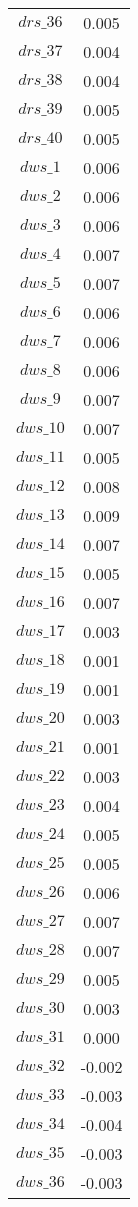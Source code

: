 \begin{center}
\begin{longtable}{cc}
$drs\_36$ 	 & 	 0.005 \\
$drs\_37$ 	 & 	 0.004 \\
$drs\_38$ 	 & 	 0.004 \\
$drs\_39$ 	 & 	 0.005 \\
$drs\_40$ 	 & 	 0.005 \\
$dws\_1$ 	 & 	 0.006 \\
$dws\_2$ 	 & 	 0.006 \\
$dws\_3$ 	 & 	 0.006 \\
$dws\_4$ 	 & 	 0.007 \\
$dws\_5$ 	 & 	 0.007 \\
$dws\_6$ 	 & 	 0.006 \\
$dws\_7$ 	 & 	 0.006 \\
$dws\_8$ 	 & 	 0.006 \\
$dws\_9$ 	 & 	 0.007 \\
$dws\_10$ 	 & 	 0.007 \\
$dws\_11$ 	 & 	 0.005 \\
$dws\_12$ 	 & 	 0.008 \\
$dws\_13$ 	 & 	 0.009 \\
$dws\_14$ 	 & 	 0.007 \\
$dws\_15$ 	 & 	 0.005 \\
$dws\_16$ 	 & 	 0.007 \\
$dws\_17$ 	 & 	 0.003 \\
$dws\_18$ 	 & 	 0.001 \\
$dws\_19$ 	 & 	 0.001 \\
$dws\_20$ 	 & 	 0.003 \\
$dws\_21$ 	 & 	 0.001 \\
$dws\_22$ 	 & 	 0.003 \\
$dws\_23$ 	 & 	 0.004 \\
$dws\_24$ 	 & 	 0.005 \\
$dws\_25$ 	 & 	 0.005 \\
$dws\_26$ 	 & 	 0.006 \\
$dws\_27$ 	 & 	 0.007 \\
$dws\_28$ 	 & 	 0.007 \\
$dws\_29$ 	 & 	 0.005 \\
$dws\_30$ 	 & 	 0.003 \\
$dws\_31$ 	 & 	 0.000 \\
$dws\_32$ 	 & 	 -0.002 \\
$dws\_33$ 	 & 	 -0.003 \\
$dws\_34$ 	 & 	 -0.004 \\
$dws\_35$ 	 & 	 -0.003 \\
$dws\_36$ 	 & 	 -0.003 \\

\end{longtable}
\end{center}
